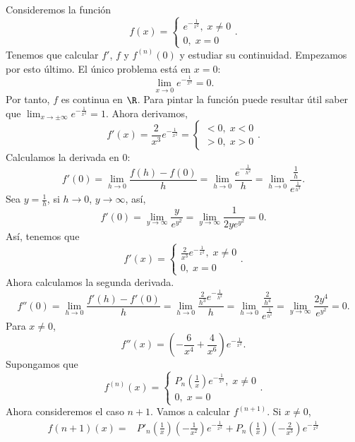 \begin{eg}
\normalfont Consideremos la función 
\[f\left(x\right) = 
\begin{cases}
e^{-\frac{1}{x^{2}}}, \; x \neq 0\\
0, \; x = 0
\end{cases}
.\]
Tenemos que calcular $\displaystyle f' $, $\displaystyle f $ y $\displaystyle f^{\left(n\right)}\left(0\right) $ y estudiar su continuidad. Empezamos por esto último. El único problema está en $\displaystyle x = 0 $:
\[ \lim_{x \to 0}e^{-\frac{1}{x^{2}}} = 0.\]
Por tanto, $\displaystyle f $ es continua en $\displaystyle \R $. Para pintar la función puede resultar útil saber que $\displaystyle \lim_{x \to \pm \infty}e^{-\frac{1}{x^{2}}} = 1 $. Ahora derivamos,
\[ f'\left(x\right) = \frac{2}{x^{3}}e^{-\frac{1}{x^{2}}} = 
\begin{cases}
< 0, \; x < 0 \\
> 0, \; x > 0
\end{cases}
.\]
Calculamos la derivada en 0:
\[f'\left(0\right) = \lim_{h \to 0}\frac{f\left(h\right)-f\left(0\right)}{h} = \lim_{h \to 0}\frac{e^{-\frac{1}{h^{2}}}}{h} = \lim_{h \to 0}\frac{\frac{1}{h}}{e^{\frac{1}{h^{2}}}} .\]
Sea $\displaystyle y = \frac{1}{h} $, si $\displaystyle h \to 0 $, $\displaystyle y \to \infty $, así,
\[f'\left(0\right) = \lim_{y \to \infty}\frac{y}{e^{y^{2}}} = \lim_{y \to \infty}\frac{1}{2ye^{y^{2}}} = 0 .\]
Así, tenemos que 
\[f'\left(x\right) = 
\begin{cases}
\frac{2}{x^{3}}e^{-\frac{1}{x^{2}}}, \; x \neq 0\\
0, \; x = 0
\end{cases}
.\]
Ahora calculamos la segunda derivada.
\[f''\left(0\right) = \lim_{h \to 0}\frac{f'\left(h\right)-f'\left(0\right)}{h} = \lim_{h \to 0} \frac{\frac{2}{h^{3}}e^{-\frac{1}{h^{2}}}}{h} = \lim_{h \to 0}\frac{\frac{2}{h^{4}}}{e^{\frac{1}{h^{2}}}} = \lim_{y \to \infty}\frac{2y^{4}}{e^{y^{2}}}=0 .\]
Para $\displaystyle x \neq 0 $,
\[f''\left(x\right) = \left(-\frac{6}{x^{4}}+\frac{4}{x^{6}}\right)e^{-\frac{1}{x^{2}}} .\]
Supongamos que 
\[ f^{\left(n\right)}\left(x\right) = 
\begin{cases}
P_{n}\left(\frac{1}{x}\right)e^{-\frac{1}{x^{2}}}, \; x \neq 0\\
0, \; x = 0
\end{cases}
.\]
Ahora consideremos el caso $\displaystyle n + 1 $. Vamos a calcular $\displaystyle f^{\left(n+1\right)} $. Si $\displaystyle x \neq 0 $, 
\[
\begin{split}
	f\left(n+1\right)\left(x\right) = & P'_{n}\left(\frac{1}{x}\right)\left(-\frac{1}{x^{2}}\right)e^{-\frac{1}{x^{2}}} + P_{n}\left(\frac{1}{x}\right)\left(-\frac{2}{x^{3}}\right)e^{-\frac{1}{x^{2}}} \\

\end{split}\]
\end{eg}
